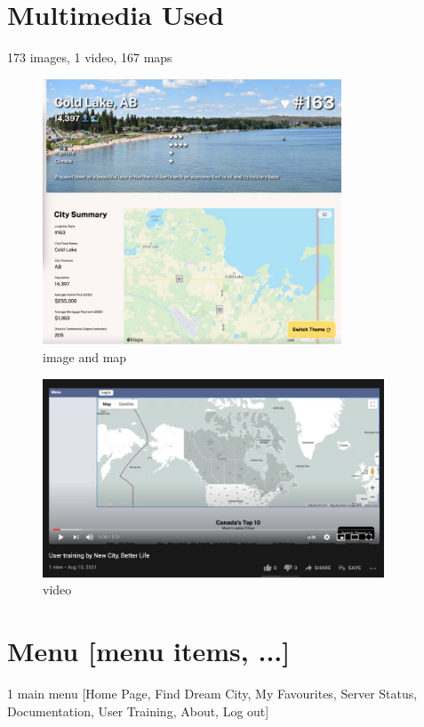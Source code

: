 \documentclass[12pt, letterpaper]{article}
\begin{document}
\section{Multimedia Used}
173 images, 1 video, 167 maps

\begin{figure}[htbp]
	\centering
	\includegraphics[width=3.5in]{images/q3_1.jpg}
	\caption{image and map}
 \end{figure}
 
 \begin{figure}[htbp]
	\centering
	\includegraphics[width=4in]{images/q13_0.png}
	\caption{video}
 \end{figure}

 \newpage
\section{Menu [menu items, ...]}
1 main menu [Home Page, Find Dream City, My Favourites, Server Status, Documentation, User Training, About, Log out]
\end{document}
